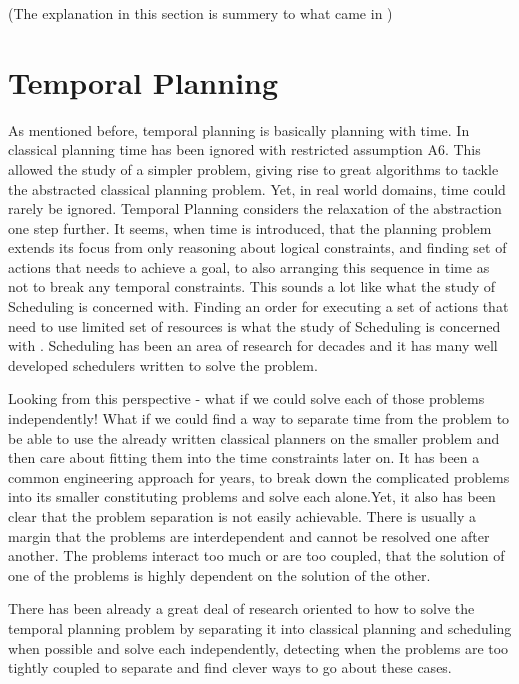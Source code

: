\documentclass
[a4paper
,english
,parskip=half
,bibliography=totoc
]{scrreprt}
\begin{document}
        (The explanation in this section is summery to what came in \citep{FF})

\chapter{Temporal Planning} \label{temporal_planning}
    
    As mentioned before, temporal planning is basically planning with time. In classical planning time has been ignored with restricted assumption A6. This allowed the study of a simpler problem, giving rise to great algorithms to tackle the abstracted classical planning problem. Yet, in real world domains, time could rarely be ignored. Temporal Planning considers the relaxation of the abstraction one step further. 
    It seems, when time is introduced, that the planning problem extends its focus from only reasoning about logical constraints, and finding set of actions that needs to achieve a goal, to also arranging this sequence in time as not to break any temporal constraints. This sounds a lot like what the study of Scheduling is concerned with. Finding an order for executing a set of actions that need to use limited set of resources is what the study of Scheduling is concerned with \citep{automated_planning}. Scheduling has been an area of research for decades and it has many well developed schedulers written to solve the problem.

    Looking from this perspective - what if we could solve each of those problems independently! What if we could find a way to separate time from the problem to be able to use the already written classical planners on the smaller problem and then care about fitting them into the time constraints later on. It has been a common engineering approach for years, to break down the complicated problems into its smaller constituting problems and solve each alone.Yet, it also has been clear that the problem separation is not easily achievable. There is usually a margin that the problems are interdependent and cannot be resolved one after another. The problems interact too much or are too coupled, that the solution of one of the problems is highly dependent on the solution of the other.

    There has been already a great deal of research oriented to how to solve the temporal planning problem by separating it into classical planning and scheduling when possible and solve each independently, detecting when the problems are too tightly coupled to separate and find clever ways to go about these cases.
\end{document}
